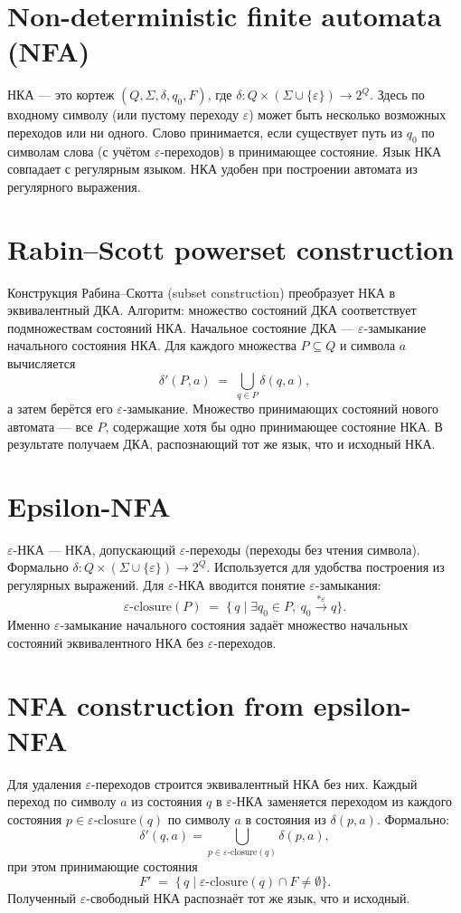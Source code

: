 \documentclass{article}
\begin{document}
	\section{Non-deterministic finite automata (NFA)}
		НКА --- это кортеж $(Q,\Sigma,\delta,q_0,F)$, где $\delta\colon Q\times(\Sigma\cup\{\varepsilon\})\to 2^Q$. Здесь по входному символу (или пустому переходу $\varepsilon$) может быть несколько возможных переходов или ни одного. Слово принимается, если существует путь из $q_0$ по символам слова (с учётом $\varepsilon$-переходов) в принимающее состояние. Язык НКА совпадает с регулярным языком. НКА удобен при построении автомата из регулярного выражения.
	
	\section{Rabin--Scott powerset construction}
	Конструкция Рабина--Скотта (subset construction) преобразует НКА в эквивалентный ДКА. Алгоритм: множество состояний ДКА соответствует подмножествам состояний НКА. Начальное состояние ДКА --- $\varepsilon$-замыкание начального состояния НКА. Для каждого множества $P\subseteq Q$ и символа $a$ вычисляется 
	\[
	\delta'(P,a) \;=\; \bigcup_{q\in P}\delta(q,a),
	\]
	а затем берётся его $\varepsilon$-замыкание. Множество принимающих состояний нового автомата --- все $P$, содержащие хотя бы одно принимающее состояние НКА. В результате получаем ДКА, распознающий тот же язык, что и исходный НКА.
	
	\section{Epsilon-NFA}
	$\varepsilon$-НКА --- НКА, допускающий $\varepsilon$-переходы (переходы без чтения символа). Формально $\delta\colon Q\times(\Sigma\cup\{\varepsilon\})\to 2^Q$. Используется для удобства построения из регулярных выражений. Для $\varepsilon$-НКА вводится понятие $\varepsilon$-замыкания: 
	\[
	\varepsilon\text{-closure}(P) \;=\; \{\, q \mid \exists q_0\in P,\ q_0\stackrel{*\varepsilon}{\longrightarrow}q\}.
	\]
	Именно $\varepsilon$-замыкание начального состояния задаёт множество начальных состояний эквивалентного НКА без $\varepsilon$-переходов.
	
	\section{NFA construction from epsilon-NFA}
	Для удаления $\varepsilon$-переходов строится эквивалентный НКА без них. Каждый переход по символу $a$ из состояния $q$ в $\varepsilon$-НКА заменяется переходом из каждого состояния $p\in\varepsilon\text{-closure}(q)$ по символу $a$ в состояния из $\delta(p,a)$. Формально: 
	\[
	\delta'(q,a) = \bigcup_{p\in\varepsilon\text{-closure}(q)}\delta(p,a),
	\]
	при этом принимающие состояния 
	\[
	F' \;=\; \{\,q \mid \varepsilon\text{-closure}(q)\cap F\neq\emptyset\}.
	\]
	Полученный $\varepsilon$-свободный НКА распознаёт тот же язык, что и исходный.
	
\end{document}
